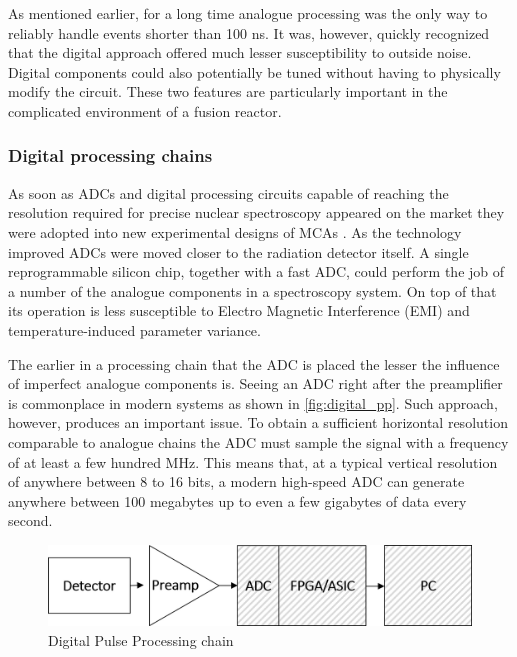 As mentioned earlier, for a long time analogue processing 
was the only way to reliably handle events shorter than 100 ns. 
It was, however, quickly recognized
that the digital approach offered 
much lesser susceptibility to outside noise. 
Digital components could also potentially be tuned without
having to physically modify the circuit.
These two features are particularly important in the 
complicated environment of a fusion reactor.
\cite{analog_vs_digital_1998}

\subsubsection{Digital processing chains}

As soon as ADCs and digital processing circuits capable of
reaching the resolution required for precise nuclear
spectroscopy appeared on the market they were 
adopted into new experimental designs of MCAs \cite{mca_fpga}.
As the technology improved ADCs were moved closer to the 
radiation detector itself.
A single reprogrammable silicon chip, together with a fast ADC,
could perform the job of a number of the analogue components
in a spectroscopy system.
On top of that its operation is less susceptible to Electro Magnetic
Interference (EMI) and temperature-induced parameter variance.
\cite{dpp_walewski}


The earlier in a processing chain that the ADC is placed the
lesser the influence of imperfect analogue components is.
Seeing an ADC right after the preamplifier is commonplace
in modern systems as shown in \autoref{fig:digital_pp}.
Such approach, however, produces an important issue.
To obtain a sufficient horizontal resolution comparable to analogue chains
the ADC must sample the signal with a frequency of at least
a few hundred MHz. This means that, at a typical vertical resolution
of anywhere between 8 to 16 bits, a modern high-speed ADC
can generate anywhere between 100 megabytes 
up to even a few gigabytes of data every second.
\cite{dpp_walewski}
\begin{figure}[H]
  \centering
  \includegraphics[width=.7\linewidth]{media/digital_pulse_processing.png}
  \caption{Digital Pulse Processing chain}
  \label{fig:digital_pp}
\end{figure}

